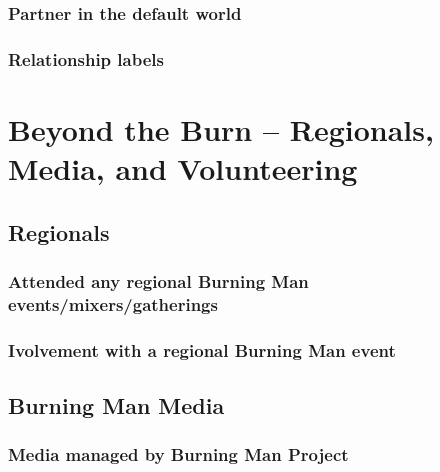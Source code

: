 \documentclass[
]{book}
\begin{document}
\hypertarget{partner-in-the-default-world}{%
\subsection{Partner in the default world}\label{partner-in-the-default-world}}

\hypertarget{relationship-labels}{%
\subsection{Relationship labels}\label{relationship-labels}}

\hypertarget{beyond-the-burn-regionals-media-and-volunteering}{%
\chapter{Beyond the Burn -- Regionals, Media, and Volunteering}\label{beyond-the-burn-regionals-media-and-volunteering}}

\hypertarget{regionals}{%
\section{Regionals}\label{regionals}}

\hypertarget{attended-any-regional-burning-man-eventsmixersgatherings}{%
\subsection{Attended any regional Burning Man events/mixers/gatherings}\label{attended-any-regional-burning-man-eventsmixersgatherings}}

\hypertarget{ivolvement-with-a-regional-burning-man-event}{%
\subsection{Ivolvement with a regional Burning Man event}\label{ivolvement-with-a-regional-burning-man-event}}

\hypertarget{burning-man-media}{%
\section{Burning Man Media}\label{burning-man-media}}

\hypertarget{media-managed-by-burning-man-project}{%
\subsection{Media managed by Burning Man Project}\label{media-managed-by-burning-man-project}}
\end{document}
